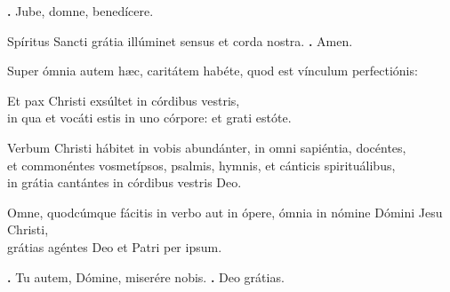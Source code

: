 \begin{small}
\textbf{\Vbar.} Jube, domne, benedícere.

Spíritus Sancti grátia illúminet sensus et corda nostra. \textbf{\Rbar.} Amen.
\end{small}


Super ómnia autem hæc, caritátem habéte, quod est vínculum perfectiónis:

Et pax Christi exsúltet in córdibus vestris, \\
in qua et vocáti estis in uno córpore: et grati estóte.

Verbum Christi hábitet in vobis abundánter, in omni sapiéntia, docéntes, \\
et commonéntes vosmetípsos, psalmis, hymnis, et cánticis spirituálibus, \\
in grátia cantántes in córdibus vestris Deo.

Omne, quodcúmque fácitis in verbo aut in ópere, ómnia in nómine Dómini Jesu Christi, \\
grátias agéntes Deo et Patri per ipsum.

\textbf{\Vbar.} Tu autem, Dómine, miserére nobis.
\textbf{\Rbar.} Deo grátias.

